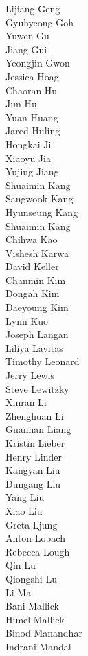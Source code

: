 Lijiang Geng\\
Gyuhyeong Goh\\
Yuwen Gu\\
Jiang Gui\\
Yeongjin Gwon\\
Jessica Hoag\\
Chaoran Hu\\
Jun Hu\\
Yuan Huang\\
Jared Huling\\
Hongkai Ji\\
Xiaoyu Jia\\
Yujing Jiang\\
Shuaimin Kang\\
Sangwook Kang\\
Hyunseung Kang\\
Shuaimin Kang\\
Chihwa Kao\\
Vishesh Karwa\\
David Keller\\
Chanmin Kim\\
Dongah Kim\\
Daeyoung Kim\\
Lynn Kuo\\
Joseph Langan\\
Liliya Lavitas\\
Timothy Leonard\\
Jerry Lewis\\
Steve Lewitzky\\
Xinran Li\\
Zhenghuan Li\\
Guannan Liang\\
Kristin Lieber\\
Henry Linder\\
Kangyan Liu\\
Dungang Liu\\
Yang Liu\\
Xiao Liu\\
Greta Ljung\\
Anton Lobach\\
Rebecca Lough\\
Qin Lu\\
Qiongshi Lu\\
Li Ma\\
Bani Mallick\\
Himel Mallick\\
Binod Manandhar\\
Indrani Mandal\\
